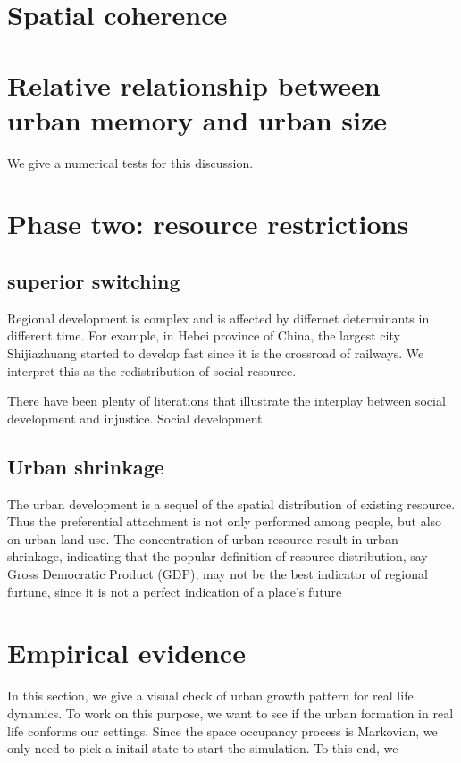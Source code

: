 \documentclass[aps,prl]{revtex4-1}
\begin{document}
\section{Spatial coherence}

\section{Relative relationship between urban memory and urban size}

We give a numerical tests for this discussion. 

\section{Phase two: resource restrictions}

\subsection{superior switching} 

Regional development is complex and is affected by differnet determinants in different time. For example, in Hebei province of China, the largest city Shijiazhuang started to develop fast since it is the crossroad of railways. We interpret this as the redistribution of social resource. 

There have been plenty of literations\cite{bowles2019neolithic} that illustrate the interplay between social development and injustice. Social development 



\subsection{Urban shrinkage}

The urban development is a sequel of the spatial distribution of existing resource. Thus the preferential attachment is not only performed among people, but also on urban land-use. The concentration of urban resource result in urban shrinkage, indicating that the popular definition of resource distribution, say Gross Democratic Product (GDP), may not be the best indicator of regional furtune, since it is not a perfect indication of a place's future 


\section{Empirical evidence}

In this section, we give a visual check of urban growth pattern for real life dynamics. To work on this purpose, we want to see if the urban formation in real life conforms our settings. Since the space occupancy process is Markovian, we only need to pick a initail state to start the simulation. To this end, we 




    
\end{document}
